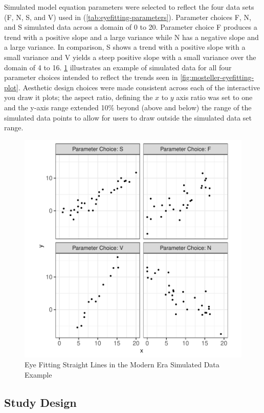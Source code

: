 \documentclass[12pt]{article}
\begin{document}
Simulated model equation parameters were selected to reflect the four
data sets (F, N, S, and V) used in \citet{mosteller_eye_1981}
(\cref{tab:eyefitting-parameters}). Parameter choices F, N, and S
simulated data across a domain of 0 to 20. Parameter choice F produces a
trend with a positive slope and a large variance while N has a negative
slope and a large variance. In comparison, S shows a trend with a
positive slope with a small variance and V yields a steep positive slope
with a small variance over the domain of 4 to 16.
\cref{fig:eyefitting-simplot} illustrates an example of simulated data
for all four parameter choices intended to reflect the trends seen in
\cref{fig:mosteller-eyefitting-plot}. Aesthetic design choices were made
consistent across each of the interactive you draw it plots; the aspect
ratio, defining the \(x\) to \(y\) axis ratio was set to one and the
y-axis range extended 10\% beyond (above and below) the range of the
simulated data points to allow for users to draw outside the simulated
data set range.

\begin{figure}[tbp]

{\centering \includegraphics[width=0.75\linewidth,]{Eye-Fitting-Stright-Lines-in-the-Modern-Era_files/figure-latex/eyefitting-simplot-1} 

}

\caption{Eye Fitting Straight Lines in the Modern Era Simulated Data Example}\label{fig:eyefitting-simplot}
\end{figure}

\hypertarget{study-design}{%
\subsection{Study Design}\label{study-design}}
\end{document}
